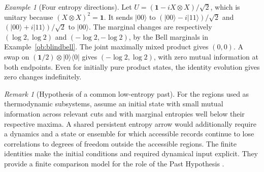 \documentclass[aps,pra,onecolumn,superscriptaddress,nofootinbib,10pt]{revtex4-2}
\theoremstyle{definition}
\theoremstyle{remark}
\newtheorem{remark}[theorem]{Remark}
\newtheorem{example}[theorem]{Example}
\begin{document}
\begin{example}[Four entropy directions]\label{ob:arrowexamples}
Let \(U=(\mathbf1-iX\otimes X)/\sqrt2\), which is unitary because
\((X\otimes X)^2=\mathbf1\).
It sends \(|00\rangle\) to \((|00\rangle-i|11\rangle)/\sqrt2\)
and \((|00\rangle+i|11\rangle)/\sqrt2\) to \(|00\rangle\).
The marginal changes are respectively \((\log2,\log2)\) and
\((-\log2,-\log2)\), by the Bell marginals in Example~\ref{ob:blindbell}.
The joint maximally mixed product gives \((0,0)\).
A swap on \((\mathbf1/2)\otimes|0\rangle\langle0|\) gives
\((-\log2,\log2)\), with zero mutual information at both endpoints.
Even for initially pure product states, the identity evolution gives
zero changes indefinitely.
\end{example}

\begin{remark}[Hypothesis of a common low-entropy past]\label{ob:past}
For the regions used as thermodynamic subsystems, assume an initial
state with small mutual information across relevant cuts and with
marginal entropies well below their respective maxima. A shared
persistent entropy arrow would additionally require a dynamics and
a state or ensemble for which accessible records continue to lose
correlations to degrees of freedom outside the accessible regions.
The finite identities make the initial conditions and required dynamical
input explicit. They provide a finite comparison model for the role
of the Past Hypothesis \cite{obr:albert,obr:penrose}.
\end{remark}
\end{document}
